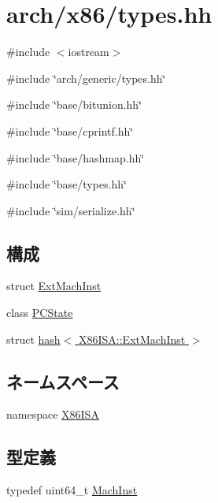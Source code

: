 \hypertarget{arch_2x86_2types_8hh}{
\section{arch/x86/types.hh}
\label{arch_2x86_2types_8hh}
}
{\ttfamily \#include $<$iostream$>$}\par
{\ttfamily \#include \char`\"{}arch/generic/types.hh\char`\"{}}\par
{\ttfamily \#include \char`\"{}base/bitunion.hh\char`\"{}}\par
{\ttfamily \#include \char`\"{}base/cprintf.hh\char`\"{}}\par
{\ttfamily \#include \char`\"{}base/hashmap.hh\char`\"{}}\par
{\ttfamily \#include \char`\"{}base/types.hh\char`\"{}}\par
{\ttfamily \#include \char`\"{}sim/serialize.hh\char`\"{}}\par
\subsection*{構成}
\begin{DoxyCompactItemize}
\item 
struct \hyperlink{structX86ISA_1_1ExtMachInst}{ExtMachInst}
\item 
class \hyperlink{classX86ISA_1_1PCState}{PCState}
\item 
struct \hyperlink{structhash_3_01X86ISA_1_1ExtMachInst_01_4}{hash$<$ X86ISA::ExtMachInst $>$}
\end{DoxyCompactItemize}
\subsection*{ネームスペース}
\begin{DoxyCompactItemize}
\item 
namespace \hyperlink{namespaceX86ISA}{X86ISA}
\end{DoxyCompactItemize}
\subsection*{型定義}
\begin{DoxyCompactItemize}
\item 
typedef uint64\_\-t \hyperlink{namespaceX86ISA_a7ceadb544bf9b4a10579b7466b0ac008}{MachInst}
\end{DoxyCompactItemize}
